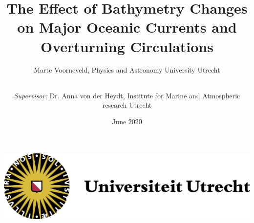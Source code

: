 \documentclass[a4paper]{article}
\title{The Effect of Bathymetry Changes on Major Oceanic Currents and Overturning Circulations}
\date{June 2020}
\author{Marte Voorneveld, Physics and Astronomy University Utrecht
	\and \\ \textit{Supervisor:} Dr. Anna von der Heydt, Institute for Marine and Atmospheric research Utrecht}
\begin{document}
	
%		
%	
%	
%	
%	
%	
%	
%	
%		
\maketitle
\begin{center}
	\includegraphics[width=0.3\linewidth]{uu}
\end{center}
\end{document}
